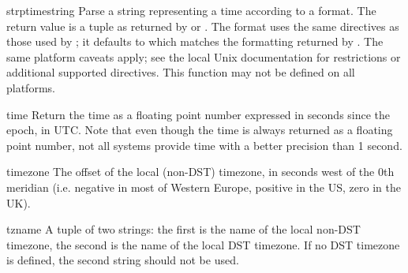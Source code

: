 \begin{funcdesc}{strptime}{string}
Parse a string representing a time according to a format.  The return 
value is a tuple as returned by  or .
The format uses the same directives as those used by
; it defaults to 
which matches the formatting returned by .  The same
platform caveats apply; see the local Unix documentation for
restrictions or additional supported directives.  This function may
not be defined on all platforms.

\end{funcdesc}

\begin{funcdesc}{time}{}
Return the time as a floating point number expressed in seconds since
the epoch, in UTC.  Note that even though the time is always returned
as a floating point number, not all systems provide time with a better
precision than 1 second.
\end{funcdesc}

\begin{datadesc}{timezone}
The offset of the local (non-DST) timezone, in seconds west of the 0th
meridian (i.e. negative in most of Western Europe, positive in the US,
zero in the UK).
\end{datadesc}

\begin{datadesc}{tzname}
A tuple of two strings: the first is the name of the local non-DST
timezone, the second is the name of the local DST timezone.  If no DST
timezone is defined, the second string should not be used.
\end{datadesc}

